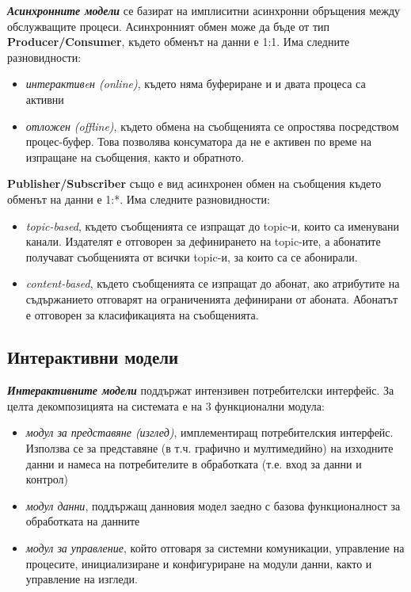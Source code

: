 \documentclass[fleqn,12pt]{article}
\begin{document}
\textbf{\textit{Асинхронните модели}} се базират на имплиситни асинхронни обръщения между обслужващите процеси.
\bigbreak
Асинхронният обмен може да бъде от тип \textbf{Producer/Consumer}, където обменът на данни е 1:1.
Има следните разновидности:
\begin{itemize}
    \item \textit{интерактивeн (online)}, където няма буфериране и и двата процеса са активни
    \item \textit{отложен (offline)}, където обмена на съобщенията се опростява посредством процес-буфер.
    Това позволява консуматора да не е активен по време на изпращане на съобщения, както и обратното.
\end{itemize}
\bigbreak
\textbf{Publisher/Subscriber} също е вид асинхронен обмен на съобщения където обменът на данни е 1:*.
Има следните разновидности:
\begin{itemize}
    \item \textit{topic-based}, където съобщенията се изпращат до topic-и, които са именувани канали.
    Издателят е отговорен за дефинирането на topic-ите, а абонатите получават съобщенията от всички topic-и, за които са се абонирали.
    \item \textit{content-based}, където съобщенията се изпращат до абонат, ако атрибутите на съдържанието отговарят на ограниченията дефинирани от абоната.
    Абонатът е отговорен за класификацията на съобщенията.
\end{itemize}

\subsection{Интерактивни модели}

\textbf{\textit{Интерактивните модели}} поддържат интензивен потребителски интерфейс.
За целта декомпозицията на системата е на 3 функционални модула:
\begin{itemize}
    \item \textit{модул за представяне (изглед)}, имплементиращ потребителския интерфейс.
    Използва се за представяне (в т.ч. графично и мултимедийно) на изходните данни и намеса на потребителите в обработката (т.е. вход за данни и контрол)
    \item \textit{модул данни}, поддържащ данновия модел заедно с базова функционалност за обработката на данните
    \item \textit{модул за управление}, който отговаря за системни комуникации, управление на процесите, инициализиране и конфигуриране на модули данни, както и управление на изгледи.
\end{itemize}
\end{document}
